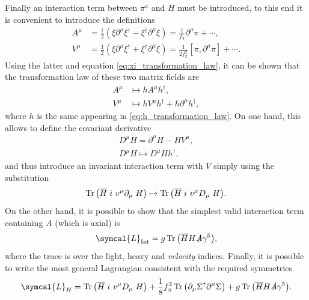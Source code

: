 Finally an interaction term between $\pi^a$ and $H$ must be introduced, to this end it is convenient to introduce the definitions
\begin{subequations}
  \begin{align}
    A^\mu &= \frac{i}{2} \left( \xi \partial^\mu \xi^\dagger - \xi^\dagger \partial^\mu \xi \right) = \frac{1}{f_\pi} \partial^\mu \pi + \cdots , \\
    V^\mu &= \frac{1}{2} \left( \xi \partial^\mu \xi^\dagger + \xi^\dagger \partial^\mu \xi \right) = \frac{1}{2 f_\pi^2} \left[ \pi , \partial^\mu \pi \right] + \cdots .
  \end{align}
\end{subequations}
Using the latter and equation \eqref{eq:xi_transformation_law}, it can be shown that the transformation law of these two matrix fields are
\begin{subequations}
  \begin{align}
    A^\mu &\mapsto h A^\mu h^\dagger , \\
    V^\mu &\mapsto h V^\mu h^\dagger + h \partial^\mu h^\dagger ,
  \end{align}
\end{subequations}
where $h$ is the same appearing in \eqref{eq:h_transformation_law}. On one hand, this allows to define the covariant derivative
\begin{gather}
  D^\mu H = \partial^\mu H - H V^\mu , \\
  D^\mu H \mapsto D^\mu H h^\dagger ,
\end{gather}
and thus introduce an invariant interaction term with $V$ simply using the substitution 
\begin{equation}
  \operatorname{Tr}{\left( \overline{H} \left. i \ v^\mu \partial_\mu \right. H \right)} \mapsto \operatorname{Tr}{\left( \overline{H} \left. i \ v^\mu D_\mu \right.  H \right)} .
\end{equation}
On the other hand, it is possible to show that the simplest valid interaction term containing $A$ (which is axial) is
\begin{equation}
  \symcal{L}_\text{Int} = g \tr{\left( \adj{H} H \slashed{A} \gamma^5 \right)} ,
\end{equation}
where the trace is over the light, heavy and \emph{velocity} indices. Finally, it is possible to write the most general Lagrangian consistent with the required symmetries
\begin{equation}
  \symcal{L}_H = \tr{\left( \adj{H} \left. i \ v^\mu  D_\mu \right. H \right)} + \frac{1}{8} f^2_\pi \tr{\left( \partial_\mu \Sigma^\dagger \partial^\mu \Sigma \right)} + g \tr{\left( \adj{H} H \slashed{A} \gamma^5 \right)} .
  \label{eq:HChPT_ground_state_lagrangian}
\end{equation}

